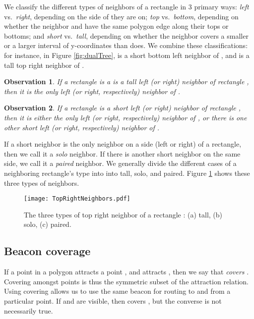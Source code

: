 \documentclass{article}
\newtheorem{obs}{Observation}
\begin{document}
			
			We classify the different types of neighbors of a rectangle  in 3 primary
			ways:  \emph{left} vs.\  \emph{right}, depending on the side of  they are
			on; \emph{top} vs.\  \emph{bottom}, depending on whether the neighbor and 
			have the same polygon edge along their tops or bottoms; and \emph{short} vs.\ 
			\emph{tall}, depending on whether the neighbor 
			covers a smaller or a larger interval of y-coordinates than  does.
			We combine these classifications: for instance, in Figure \ref{fig:dualTree},
			 is a short bottom left neighbor of , and  is a tall top right neighbor of
			.
		
		\begin{obs}
			If a rectangle  is a is a tall left (or right) neighbor of rectangle ,
			then it is the \emph{only} left (or right, respectively) neighbor of .
		\end{obs}
		
		\begin{obs}
			If a rectangle  is a short left (or right) neighbor of rectangle , then
			it is either the \emph{only} left (or right, respectively) neighbor of , 
			or there is one other short left (or right, respectively) neighbor of .
		\end{obs}
		
		If a short neighbor is the only neighbor on a side (left or right) of a
		rectangle, then we call it a \emph{solo} neighbor.  If there is another short
		neighbor on the same side, we call it a \emph{paired} neighbor.
		We generally divide the different cases of a neighboring rectangle's type into
		into tall, solo, and paired.
		Figure \ref{fig:topRight} shows these three types of neighbors.
		 
		\begin{figure}[htbp] 
			\begin{center}
				\texttt{[image: TopRightNeighbors.pdf]} 
			\end{center}
			\caption{
				The three types of top right neighbor  of a rectangle :
				(a) tall, (b) solo, (c) paired. 
			}
			\label{fig:topRight} 
		\end{figure}
		

		
	\subsection{Beacon coverage}\label{sec:coverage}
	
		If a point  in a polygon attracts a point , and  attracts , then we
		say that  \emph{covers} .
		Covering amongst points is thus the symmetric subset of the attraction
		relation.
		Using covering allows us to use the same beacon for routing to and from a
		particular point.  If  and  are visible, then  covers , but the
		converse is not necessarily true.
\end{document}
